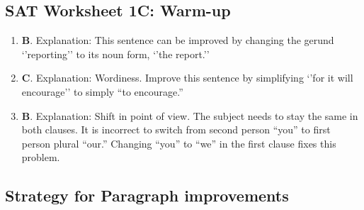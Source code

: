 
\subsection{SAT Worksheet 1C: Warm-up}

\begin{enumerate}
\item \textbf{B}. Explanation:  This sentence can be improved by changing the gerund `'reporting'' to its noun form, `'the report.''
\item \textbf{C}. Explanation:  Wordiness.  Improve this sentence by simplifying `'for it will encourage'' to simply ``to encourage.''
\item \textbf{B}. Explanation:  Shift in point of view.  The subject needs to stay the same in both clauses.  It is incorrect to switch from second person ``you'' to first person plural ``our.''  Changing ``you'' to ``we'' in the first clause fixes this problem.
\end{enumerate}



\subsection{Strategy for Paragraph improvements}

